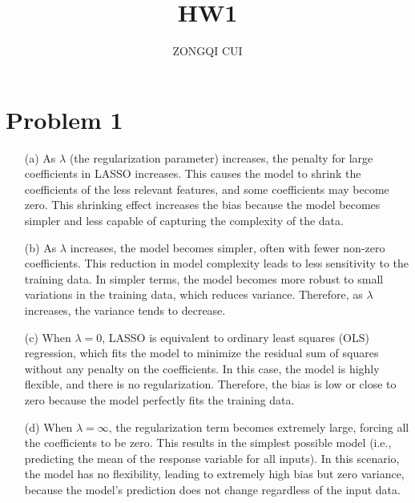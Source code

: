 \documentclass[10pt,letterpaper]{article}
\title{HW1}
\author{ZONGQI CUI}
\begin{document}
\maketitle
    \section{Problem 1}
        \begin{itemize}
            \item[(a)] As $\lambda$ (the regularization parameter) increases, the penalty for large coefficients in LASSO increases.
            This causes the model to shrink the coefficients of the less relevant features, and some coefficients may become zero. 
            This shrinking effect increases the bias because the model becomes simpler and less capable of capturing the complexity of the data.
            \item[(b)] As $\lambda$ increases, the model becomes simpler, often with fewer non-zero coefficients.
            This reduction in model complexity leads to less sensitivity to the training data.
            In simpler terms, the model becomes more robust to small variations in the training data, which reduces variance. Therefore, as $\lambda$ increases, the variance tends to decrease.
            \item[(c)] When $\lambda = 0$, LASSO is equivalent to ordinary least squares (OLS) regression, which fits the model to minimize the residual sum of squares without any penalty on the coefficients. In this case, the model is highly flexible, and there is no regularization. Therefore, the bias is low or close to zero because the model perfectly fits the training data.
            \item[(d)] When $\lambda = \infty $, the regularization term becomes extremely large, forcing all the coefficients to be zero. This results in the simplest possible model (i.e., predicting the mean of the response variable for all inputs). In this scenario, the model has no flexibility, leading to extremely high bias but zero variance, because the model's prediction does not change regardless of the input data.
        \end{itemize}
\end{document}

